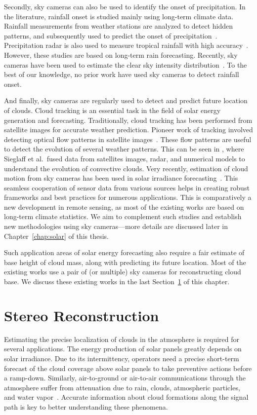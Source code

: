 Secondly, sky cameras can also be used to identify the onset of precipitation. In the literature, rainfall onset is studied mainly using long-term climate data. Rainfall measurements from weather stations are analyzed to detect hidden patterns, and subsequently used to predict the onset of precipitation~\cite{Farahmand2014}. Precipitation radar is also used to measure tropical rainfall with high accuracy~\cite{TRMM2002}. However, these studies are based on long-term rain forecasting. Recently, sky cameras have been used to estimate the clear sky intensity distribution~\cite{Nou2015}. To the best of our knowledge, no prior work have used sky cameras to detect rainfall onset. 

And finally, sky cameras are regularly used to detect and predict future location of clouds. Cloud tracking is an essential task in the field of solar energy generation and forecasting. Traditionally, cloud tracking has been performed from satellite images for accurate weather prediction. Pioneer work of tracking involved detecting optical flow patterns in satellite images~\cite{trackingpioneer}. These flow patterns are useful to detect the evolution of several weather patterns. This can be seen in \cite{Sieglaff13}, where Sieglaff et al.\ fused data from satellites images, radar, and numerical models to understand the evolution of convective clouds. Very recently, estimation of cloud motion from sky cameras has been used in solar irradiance forecasting~\cite{Chow15,Chauvin2016}. This seamless cooperation of sensor data from various sources helps in creating robust frameworks and best practices for numerous applications. This is comparatively a new development in remote sensing, as most of the existing works are based on long-term climate statistics. We aim to complement such studies and establish new methodologies using sky cameras---more details are discussed later in Chapter~\ref{chap:solar} of this thesis. 

Such application areas of solar energy forecasting also require a fair estimate of base height of cloud mass, along with predicting its future location. Most of the existing works use a pair of (or multiple) sky cameras for reconstructing cloud base. We discuss these existing works in the last Section~\ref{sec:lit-3D} of this chapter.

\section{Stereo Reconstruction}
\label{sec:lit-3D}
Estimating the precise localization of clouds in the atmosphere is required for several applications. The energy production of solar panels greatly depends on solar irradiance. Due to its intermittency, operators need a precise short-term forecast of the cloud coverage above solar panels to take preventive actions before a ramp-down. Similarly, air-to-ground or air-to-air communications through the atmosphere suffer from attenuation due to rain, clouds, atmospheric particles, and water vapor~\cite{site_diversity}. Accurate information about cloud formations along the signal path is key to better understanding these phenomena. 

